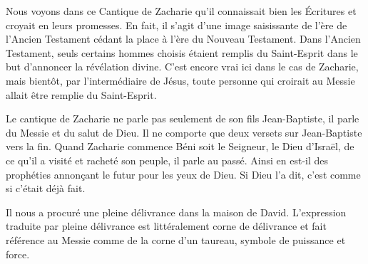 

Nous voyons dans ce Cantique de Zacharie qu'il connaissait bien les Écritures et croyait en leurs promesses. En fait, il s'agit d'une image saisissante de l'ère de l'Ancien Testament cédant la place à l'ère du Nouveau Testament. Dans l'Ancien Testament, seuls certains hommes choisis étaient remplis du Saint-Esprit dans le but d'annoncer la révélation divine. C'est encore vrai ici dans le cas de Zacharie, mais bientôt, par l'intermédiaire de Jésus, toute personne qui croirait au Messie allait être remplie du Saint-Esprit.

Le cantique de Zacharie ne parle pas seulement de son fils Jean-Baptiste, il parle du Messie et du salut de Dieu. Il ne comporte que deux versets sur Jean-Baptiste vers la fin. Quand Zacharie commence\frcolon{} \Og Béni soit le Seigneur, le Dieu d’Israël, de ce qu’il a visité et racheté son peuple\Fg{}, il parle au passé. Ainsi en est-il des prophéties annonçant le futur pour les yeux de Dieu. Si Dieu l'a dit, c'est comme si c'était déjà fait.

Il \Og nous a procuré une pleine délivrance dans la maison de David. \Fg{} L'expression traduite par \Og pleine délivrance \Fg{} est littéralement \Og corne de délivrance \Fg{} et fait référence au Messie comme de la corne d'un taureau, symbole de puissance et force.

